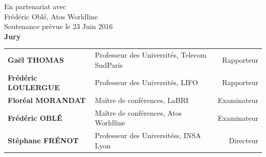 \begin{center}
En partenariat avec\\
Frédéric Oblé, Atos Worldline\\[1em]

Soutenance prévue le 23 Juin 2016\\[1em]

{\large\textbf{Jury}}\\[1em]

\begin{tabu} {l X[l] r}
\textbf{Gaël \MakeUppercase{Thomas}}        & Professeur des Universités, Telecom SudParis & Rapporteur\\
\textbf{Frédéric \MakeUppercase{Loulergue}~} & Professeur des Universités, LIFO             & Rapporteur\\
\textbf{Floréal \MakeUppercase{Morandat}}   & Maître de conférences, LaBRI                 & Examinateur\\
\textbf{Frédéric \MakeUppercase{Oblé}}      & Maître de conférences, Atos Worldline        & Examinateur\\
\textbf{Stéphane \MakeUppercase{Frénot}}    & Professeur des Universitéss, INSA Lyon       & Directeur\\
\end{tabu}
\vfill
\end{center}
\restoregeometry
\eject